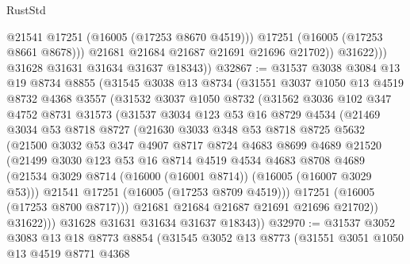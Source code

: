 \begin{lexlean}{RustStd}
\begin{coremodule}
                      @21541
                      @17251
                      (@16005 (@17253 @8670 @4519)))
                    @17251
                    (@16005 (@17253 @8661 @8678)))
                  @21681
                  @21684
                  @21687
                  @21691
                  @21696
                  @21702))
              @31622)))
        @31628
        @31631
        @31634
        @31637
        @18343))
@32867 := @31537
    @3038
    @3084
    @13
    @19
    @8734
    @8855
    (@31545
      @3038
      @13
      @8734
      (@31551
        @3037
        @1050
        @13
        @4519
        @8732
        @4368
        @3557
        (@31532
          @3037
          @1050
          @8732
          (@31562
            @3036
            @102
            @347
            @4752
            @8731
            @31573
            (@31537
              @3034
              @123
              @53
              @16
              @8729
              @4534
              (@21469
                @3034
                @53
                @8718
                @8727
                (@21630
                  @3033
                  @348
                  @53
                  @8718
                  @8725
                  @5632
                  (@21500
                    @3032
                    @53
                    @347
                    @4907
                    @8717
                    @8724
                    @4683
                    @8699
                    @4689
                    @21520
                    (@21499
                      @3030
                      @123
                      @53
                      @16
                      @8714
                      @4519
                      @4534
                      @4683
                      @8708
                      @4689
                      (@21534 @3029 @8714 (@16000 (@16001 @8714)) (@16005 (@16007 @3029 @53)))
                      @21541
                      @17251
                      (@16005 (@17253 @8709 @4519)))
                    @17251
                    (@16005 (@17253 @8700 @8717)))
                  @21681
                  @21684
                  @21687
                  @21691
                  @21696
                  @21702))
              @31622)))
        @31628
        @31631
        @31634
        @31637
        @18343))
@32970 := @31537
    @3052
    @3083
    @13
    @18
    @8773
    @8854
    (@31545
      @3052
      @13
      @8773
      (@31551
        @3051
        @1050
        @13
        @4519
        @8771
        @4368

\end{coremodule}
\end{lexlean}
